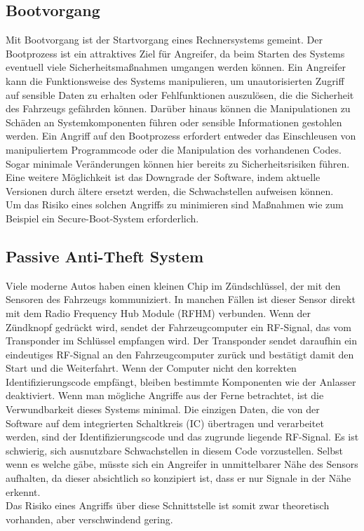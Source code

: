 \subsection{Bootvorgang}
Mit Bootvorgang ist der Startvorgang eines Rechnersystems gemeint. Der Bootprozess ist ein attraktives Ziel für Angreifer, da beim Starten des Systems eventuell viele Sicherheitsmaßnahmen umgangen werden können. Ein Angreifer kann die Funktionsweise des Systems manipulieren, um unautorisierten Zugriff auf sensible Daten zu erhalten oder Fehlfunktionen auszulösen, die die Sicherheit des Fahrzeugs gefährden können. Darüber hinaus können die Manipulationen zu Schäden an Systemkomponenten führen oder sensible Informationen gestohlen werden. Ein Angriff auf den Bootprozess erfordert entweder das Einschleusen von manipuliertem Programmcode oder die Manipulation des vorhandenen Codes. Sogar minimale Veränderungen können hier bereits zu Sicherheitsrisiken führen. Eine weitere Möglichkeit ist das Downgrade der Software, indem aktuelle Versionen durch ältere ersetzt werden, die Schwachstellen aufweisen können. \cite[83]{Wurm.2022} \\
Um das Risiko eines solchen Angriffs zu minimieren sind Maßnahmen wie zum Beispiel ein Secure-Boot-System erforderlich.

\subsection{Passive Anti-Theft System}
Viele moderne Autos haben einen kleinen Chip im Zündschlüssel, der mit den Sensoren des Fahrzeugs kommuniziert. In manchen Fällen ist dieser Sensor direkt mit dem Radio Frequency Hub Module (RFHM) verbunden. Wenn der Zündknopf gedrückt wird, sendet der Fahrzeugcomputer ein RF-Signal, das vom Transponder im Schlüssel empfangen wird. Der Transponder sendet daraufhin ein eindeutiges RF-Signal an den Fahrzeugcomputer zurück und bestätigt damit den Start und die Weiterfahrt. Wenn der Computer nicht den korrekten Identifizierungscode empfängt, bleiben bestimmte Komponenten wie der Anlasser deaktiviert.
Wenn man mögliche Angriffe aus der Ferne betrachtet, ist die Verwundbarkeit dieses Systems minimal. Die einzigen Daten, die von der Software auf dem integrierten Schaltkreis (IC) übertragen und verarbeitet werden, sind der Identifizierungscode und das zugrunde liegende RF-Signal. Es ist schwierig, sich ausnutzbare Schwachstellen in diesem Code vorzustellen. Selbst wenn es welche gäbe, müsste sich ein Angreifer in unmittelbarer Nähe des Sensors aufhalten, da dieser absichtlich so konzipiert ist, dass er nur Signale in der Nähe erkennt.\cite[13]{Miller.2015} \\
Das Risiko eines Angriffs über diese Schnittstelle ist somit zwar theoretisch vorhanden, aber verschwindend gering.

